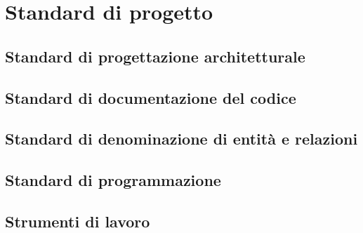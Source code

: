 \documentclass[../DefinizioneDiProdotto.tex]{subfiles}
\begin{document}
\section{Standard di progetto}
	\subsection{Standard di progettazione architetturale}
	
	\subsection{Standard di documentazione del codice}

	\subsection{Standard di denominazione di entità e relazioni}

	\subsection{Standard di programmazione}

	\subsection{Strumenti di lavoro}	
	
\end{document}
